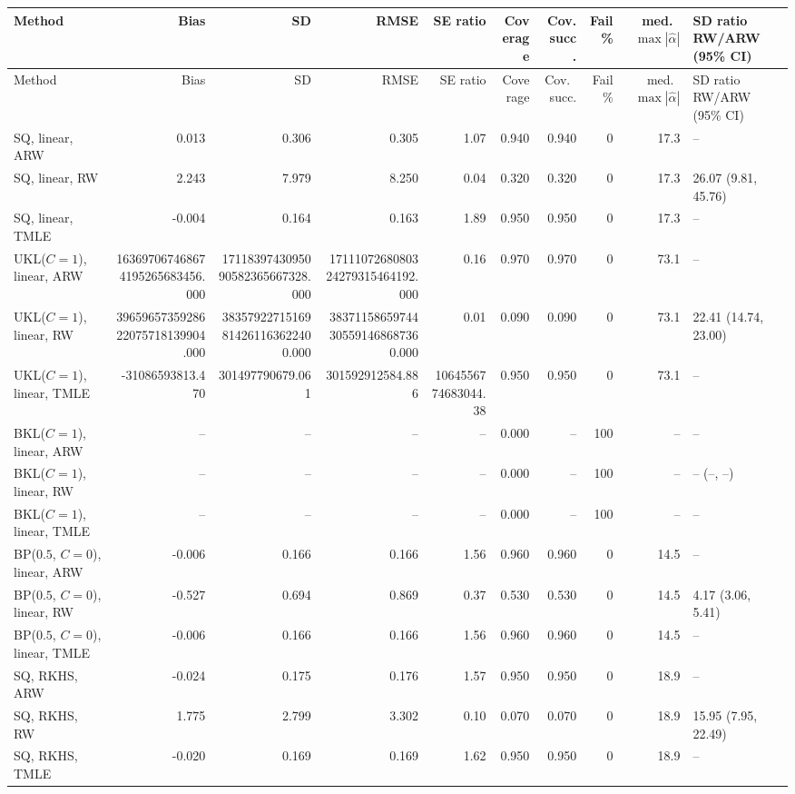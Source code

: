 \begin{tabular}{lrrrrrrrrl}
\hline
Method & Bias & SD & RMSE & SE ratio & Coverage & Cov.\ succ. & Fail \% & med.\ $\max|\widehat\alpha|$ & SD ratio RW/ARW (95\% CI) \\
\hline
\endfirsthead
\hline
Method & Bias & SD & RMSE & SE ratio & Coverage & Cov.\ succ. & Fail \% & med.\ $\max|\widehat\alpha|$ & SD ratio RW/ARW (95\% CI) \\
\hline
\endhead
SQ, linear, ARW & 0.013 & 0.306 & 0.305 & 1.07 & 0.940 & 0.940 & 0 & 17.3 & -- \\
SQ, linear, RW & 2.243 & 7.979 & 8.250 & 0.04 & 0.320 & 0.320 & 0 & 17.3 & 26.07 (9.81, 45.76) \\
SQ, linear, TMLE & -0.004 & 0.164 & 0.163 & 1.89 & 0.950 & 0.950 & 0 & 17.3 & -- \\
UKL($C=1$), linear, ARW & 163697067468674195265683456.000 & 1711839743095090582365667328.000 & 1711107268080324279315464192.000 & 0.16 & 0.970 & 0.970 & 0 & 73.1 & -- \\
UKL($C=1$), linear, RW & 3965965735928622075718139904.000 & 38357922715169814261163622400.000 & 38371158659744305591468687360.000 & 0.01 & 0.090 & 0.090 & 0 & 73.1 & 22.41 (14.74, 23.00) \\
UKL($C=1$), linear, TMLE & -31086593813.470 & 301497790679.061 & 301592912584.886 & 1064556774683044.38 & 0.950 & 0.950 & 0 & 73.1 & -- \\
BKL($C=1$), linear, ARW & -- & -- & -- & -- & 0.000 & -- & 100 & -- & -- \\
BKL($C=1$), linear, RW & -- & -- & -- & -- & 0.000 & -- & 100 & -- & -- (--, --) \\
BKL($C=1$), linear, TMLE & -- & -- & -- & -- & 0.000 & -- & 100 & -- & -- \\
BP($0.5$, $C=0$), linear, ARW & -0.006 & 0.166 & 0.166 & 1.56 & 0.960 & 0.960 & 0 & 14.5 & -- \\
BP($0.5$, $C=0$), linear, RW & -0.527 & 0.694 & 0.869 & 0.37 & 0.530 & 0.530 & 0 & 14.5 & 4.17 (3.06, 5.41) \\
BP($0.5$, $C=0$), linear, TMLE & -0.006 & 0.166 & 0.166 & 1.56 & 0.960 & 0.960 & 0 & 14.5 & -- \\
SQ, RKHS, ARW & -0.024 & 0.175 & 0.176 & 1.57 & 0.950 & 0.950 & 0 & 18.9 & -- \\
SQ, RKHS, RW & 1.775 & 2.799 & 3.302 & 0.10 & 0.070 & 0.070 & 0 & 18.9 & 15.95 (7.95, 22.49) \\
SQ, RKHS, TMLE & -0.020 & 0.169 & 0.169 & 1.62 & 0.950 & 0.950 & 0 & 18.9 & -- \\

\end{tabular}

